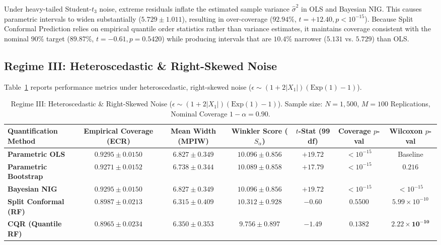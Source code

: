 \documentclass[journal]{IEEEtran}
\begin{document}
Under heavy-tailed Student-$t_3$ noise, extreme residuals inflate the estimated sample variance $\hat{\sigma}^2$ in OLS and Bayesian NIG. This causes parametric intervals to widen substantially ($5.729 \pm 1.011$), resulting in over-coverage ($92.94\%$, $t = +12.40, p < 10^{-15}$). Because Split Conformal Prediction relies on empirical quantile order statistics rather than variance estimates, it maintains coverage consistent with the nominal $90\%$ target ($89.87\%$, $t = -0.61, p = 0.5420$) while producing intervals that are $10.4\%$ narrower ($5.131$ vs. $5.729$) than OLS.

\subsection{Regime III: Heteroscedastic \& Right-Skewed Noise}
Table~\ref{tab:regime3} reports performance metrics under heteroscedastic, right-skewed noise ($\epsilon \sim (1 + 2|X_1|)(\text{Exp}(1) - 1)$).

\begin{table}[!t]
\centering
\caption{Regime III: Heteroscedastic \& Right-Skewed Noise ($\epsilon \sim (1 + 2|X_1|)(\text{Exp}(1) - 1)$). Sample size: $N = 1,500$, $M = 100$ Replications, Nominal Coverage $1 - \alpha = 0.90$.}
\label{tab:regime3}
\begin{tabular}{lcccccc}
\toprule
\textbf{Quantification Method} & \textbf{Empirical Coverage (ECR)} & \textbf{Mean Width (MPIW)} & \textbf{Winkler Score ($S_\alpha$)} & \textbf{$t$-Stat (99 df)} & \textbf{Coverage $p$-val} & \textbf{Wilcoxon $p$-val} \\
\midrule
\textbf{Parametric OLS} & $0.9295 \pm 0.0150$ & $6.827 \pm 0.349$ & $10.096 \pm 0.856$ & $+19.72$ & $< 10^{-15}$ & Baseline \\
\textbf{Parametric Bootstrap} & $0.9271 \pm 0.0152$ & $6.738 \pm 0.344$ & $10.089 \pm 0.858$ & $+17.79$ & $< 10^{-15}$ & $0.216$ \\
\textbf{Bayesian NIG} & $0.9295 \pm 0.0150$ & $6.827 \pm 0.349$ & $10.096 \pm 0.856$ & $+19.72$ & $< 10^{-15}$ & $< 10^{-15}$ \\
\textbf{Split Conformal (RF)} & $\mathbf{0.8987} \pm \mathbf{0.0213}$ & $\mathbf{6.315} \pm \mathbf{0.409}$ & $10.312 \pm 0.928$ & $-0.60$ & $0.5500$ & $5.99 \times 10^{-10}$ \\
\textbf{CQR (Quantile RF)} & $0.8965 \pm 0.0234$ & $6.350 \pm 0.353$ & $\mathbf{9.756} \pm \mathbf{0.897}$ & $-1.49$ & $0.1382$ & $\mathbf{2.22 \times 10^{-10}}$ \\
\bottomrule
\end{tabular}
\end{table}
\end{document}
